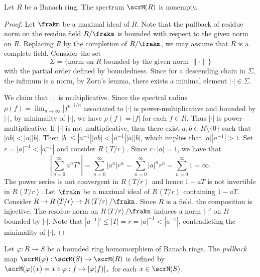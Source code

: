     \begin{theorem}\label{thm:norm_spectrum_of_Banach_rings_is_nonempty}
        Let \(R\) be a Banach ring.
        The spectrum \(\scrM(R)\) is nonempty.
    \end{theorem}
    \begin{proof}
        Let \(\frakm\) be a maximal ideal of \(R\).
        Note that the pullback of residue norm on the residue field \(R/\frakm\) is bounded with respect to the given norm on \(R\).
        Replacing \(R\) by the completion of \(R/\frakm\), we may assume that \(R\) is a complete field.
        Consider the set 
        \[ \Sigma = \{ \text{norm on } R \text{ bounded by the given norm } \|\cdot\| \} \]
        with the partial order defined by boundedness.
        Since for a descending chain in \(\Sigma\), the infimum is a norm, by Zorn's lemma, there exists a minimal element \(|\cdot| \in \Sigma\).
        
        We claim that \(|\cdot|\) is multiplicative.
        Since the spectral radius \(\rho(f) = \lim_{n \to \infty} |f^n|^{1/n}\) associated to \(|\cdot|\) is power-multiplicative and bounded by \(|\cdot|\), by minimality of \(|\cdot|\), we have \(\rho(f) = |f|\) for each \(f \in R\).
        Thus \(|\cdot|\) is power-multiplicative.
        If \(|\cdot|\) is not multiplicative, then there exist \(a,b \in R\setminus \{0\}\) such that \(|ab|<|a||b|\).
        Then \(|b| \leq |a^{-1}| |ab| < |a^{-1}| |a| |b|\), which implies that \(|a| |a^{-1}| > 1\).
        Set \(r = |a|^{-1} < |a^{-1}|\) and consider \(R\left<T/r\right>\).
        Since \(r \cdot |a| = 1\), we have that 
        \[ \left|\sum_{n=0}^\infty a^n T^n\right| = \sum_{n=0}^\infty |a^n| r^n = \sum_{n=0}^\infty |a|^n r^n = \sum_{n=0}^\infty 1 = \infty. \]
        The power series is not convergent in \(R\left<T/r\right>\) and hence \(1 - aT\) is not invertible in \(R\left<T/r\right>\).
        Let \(\frakn\) be a maximal ideal of \(R\left<T/r\right>\) containing \(1 - aT\).
        Consider \( R \to R\left<T/r\right> \to R\left<T/r\right>/\frakn \).
        Since \(R\) is a field, the composition is injective.
        The residue norm on \(R\left<T/r\right>/\frakn\) induces a norm \(|\cdot|'\) on \(R\) bounded by \(|\cdot|\).
        Note that \(|a^{-1}|' \leq |T| = r = |a|^{-1} < |a^{-1}|\), contradicting the minimality of \(|\cdot|\).  
    \end{proof}
        
    \begin{definition}\label{def:pullback_of_ring_homomorphism_of_banach_rings_on_spectrum}
        Let \(\varphi: R \to S\) be a bounded ring homomorphism of Banach rings.
        The \emph{pullback} map \(\scrM(\varphi): \scrM(S) \to \scrM(R)\) is defined by \(\scrM(\varphi)(x) = x \circ \varphi: f \mapsto |\varphi(f)|_x\) for each \(x \in \scrM(S)\).
    \end{definition}

